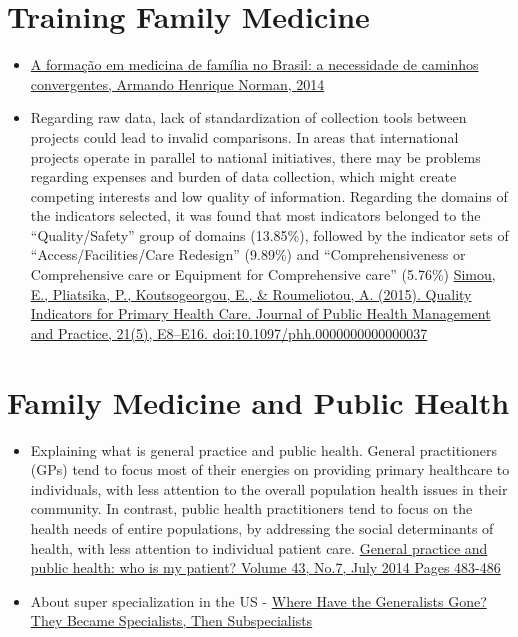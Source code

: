 \documentclass[]{book}
\begin{document}
\hypertarget{training-family-medicine}{%
\section*{Training Family Medicine}\label{training-family-medicine}}

\begin{itemize}
\item
  \href{https://www.rbmfc.org.br/rbmfc/article/view/875}{A formação em medicina de família no Brasil: a necessidade de caminhos convergentes, Armando Henrique Norman, 2014}
\item
  Regarding raw data, lack of standardization of collection tools between projects could lead to invalid comparisons. In areas that international projects operate in parallel to national initiatives, there may be problems regarding expenses and burden of data collection, which might create competing interests and low quality of information. Regarding the domains of the indicators selected,
  it was found that most indicators belonged to the ``Quality/Safety'' group of domains (13.85\%), followed by the indicator sets of ``Access/Facilities/Care Redesign'' (9.89\%) and ``Comprehensiveness or Comprehensive care or Equipment for Comprehensive care''
  (5.76\%) \href{https://sci-hub.tw/10.1097/phh.0000000000000037}{Simou, E., Pliatsika, P., Koutsogeorgou, E., \& Roumeliotou, A. (2015). Quality Indicators for Primary Health Care. Journal of Public Health Management and Practice, 21(5), E8--E16. doi:10.1097/phh.0000000000000037}
\end{itemize}

\hypertarget{family-medicine-and-public-health}{%
\section*{Family Medicine and Public Health}\label{family-medicine-and-public-health}}

\begin{itemize}
\item
  Explaining what is general practice and public health. General practitioners (GPs) tend to focus most of their energies on providing primary healthcare to individuals, with less attention to the overall population health issues in their community. In contrast, public health practitioners tend to focus on the health needs of entire populations, by addressing the social determinants of health, with less attention to individual patient care.
  \href{https://www.racgp.org.au/afp/2014/july/who-is-my-patient/}{General practice and public health: who is my patient? Volume 43, No.7, July 2014 Pages 483-486}
\item
  About super specialization in the US - \href{https://www.amjmed.com/article/S0002-9343\%2817\%2930134-1/pdf}{Where Have the Generalists Gone? They Became Specialists, Then Subspecialists}
\end{itemize}
\end{document}
